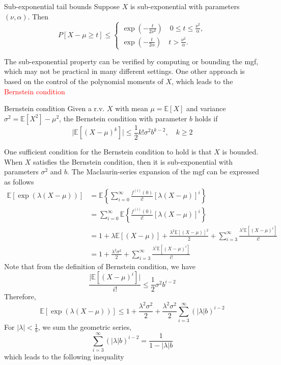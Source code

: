 \documentclass[10pt,handout,english]{beamer}
\newcommand{\E}{\mathbb{E}}
\newcommand{\1}{\mathbbm{1}}
\begin{document}
\begin{frame}[allowframebreaks]
\begin{block}{Sub-exponential tail bounds}
Suppose $X$ is sub-exponential with parameters $(\nu,\alpha)$. Then
\[
P[X-\mu\geq t]\leq
\begin{cases}
\exp\left(-\frac{t}{2\nu^2}\right)\quad 0\leq t\leq\frac{\nu^2}{\alpha},\\
\exp\left(-\frac{t}{2\alpha}\right)\quad t>\frac{\nu^2}{\alpha}.
\end{cases}
\]
\end{block}
The sub-exponential property can be verified by computing or bounding the mgf, which may not be practical in many different settings. One other approach is based on the control of the polynomial moments of $X$, which leads to the \textcolor{red}{Bernstein condition}
\begin{block}{Bernstein condition}
Given a r.v. $X$ with mean $\mu=\E[X]$ and variance $\sigma^2=\E[X^2]-\mu^2$, the Bernstein condition with parameter $b$ holds if
\[
\lvert \E[(X-\mu)^k]\rvert\leq\frac{1}{2}k!\sigma^2b^{k-2},\quad k\geq 2
\]
\end{block} 
One sufficient condition for the Bernstein condition to hold is that $X$ is bounded. When $X$ satisfies the Bernstein condition, then it is sub-exponential with parameters $\sigma^2$ and $b$. The Maclaurin-series expansion of the mgf can be expressed as follows
\begin{align*}
\E[\exp(\lambda(X-\mu))]&=\E\left\{\sum\limits_{i=0}^{\infty}\frac{f^{(i)}(0)}{i!}\left[\lambda(X-\mu)\right]^i\right\}\\
&=\sum\limits_{i=0}^{\infty}\E\left\{\frac{f^{(i)}(0)}{i!}\left[\lambda(X-\mu)\right]^i\right\}\\
&=1+\lambda\E[(X-\mu)]+\frac{\lambda^2\E[(X-\mu)]^2}{2}+\sum\limits_{i=3}^{\infty}\frac{\lambda^i\E[(X-\mu)^i]}{i!}\\
&=1+\frac{\lambda^2\sigma^2}{2}+\sum\limits_{i=3}^{\infty}\frac{\lambda^i\E[(X-\mu)^i]}{i!}
\end{align*}
Note that from the definition of Bernstein condition, we have
\[
\frac{\lvert \E[(X-\mu)^i]\rvert}{i!}\leq\frac{1}{2}\sigma^2b^{i-2}
\]
Therefore,
\[
\E[\exp(\lambda(X-\mu))]\leq1+\frac{\lambda^2\sigma^2}{2}+\frac{\lambda^2\sigma^2}{2}\sum\limits_{i=3}^{\infty}(\lvert\lambda \rvert b)^{i-2}
\]
For $\lvert\lambda\rvert<\frac{1}{b}$, we sum the geometric series,
\[
\sum\limits_{i=3}^{\infty}(\lvert\lambda \rvert b)^{i-2}=\frac{1}{1-\lvert\lambda\rvert b}
\] 
which leads to the following inequality

\end{frame}
\end{document}
